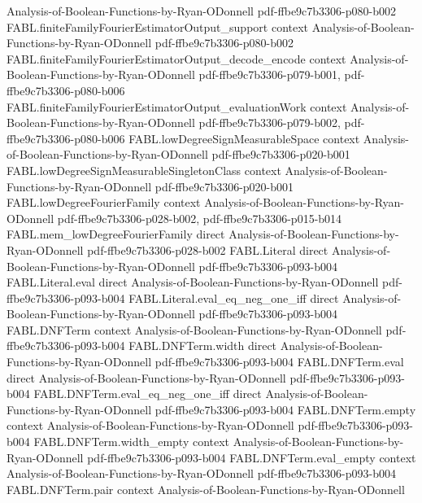 \begin{theorem}
  {Analysis-of-Boolean-Functions-by-Ryan-ODonnell}
  {pdf-ffbe9c7b3306-p080-b002}
\proofstep
  {FABL.finiteFamilyFourierEstimatorOutput_support}
  {context}
  {Analysis-of-Boolean-Functions-by-Ryan-ODonnell}
  {pdf-ffbe9c7b3306-p080-b002}
\proofstep
  {FABL.finiteFamilyFourierEstimatorOutput_decode_encode}
  {context}
  {Analysis-of-Boolean-Functions-by-Ryan-ODonnell}
  {pdf-ffbe9c7b3306-p079-b001,
    pdf-ffbe9c7b3306-p080-b006}
\proofstep
  {FABL.finiteFamilyFourierEstimatorOutput_evaluationWork}
  {context}
  {Analysis-of-Boolean-Functions-by-Ryan-ODonnell}
  {pdf-ffbe9c7b3306-p079-b002,
    pdf-ffbe9c7b3306-p080-b006}
\proofstep
  {FABL.lowDegreeSignMeasurableSpace}
  {context}
  {Analysis-of-Boolean-Functions-by-Ryan-ODonnell}
  {pdf-ffbe9c7b3306-p020-b001}
\proofstep
  {FABL.lowDegreeSignMeasurableSingletonClass}
  {context}
  {Analysis-of-Boolean-Functions-by-Ryan-ODonnell}
  {pdf-ffbe9c7b3306-p020-b001}
\proofstep
  {FABL.lowDegreeFourierFamily}
  {context}
  {Analysis-of-Boolean-Functions-by-Ryan-ODonnell}
  {pdf-ffbe9c7b3306-p028-b002,
    pdf-ffbe9c7b3306-p015-b014}
\proofstep
  {FABL.mem_lowDegreeFourierFamily}
  {direct}
  {Analysis-of-Boolean-Functions-by-Ryan-ODonnell}
  {pdf-ffbe9c7b3306-p028-b002}
\proofstep
  {FABL.Literal}
  {direct}
  {Analysis-of-Boolean-Functions-by-Ryan-ODonnell}
  {pdf-ffbe9c7b3306-p093-b004}
\proofstep
  {FABL.Literal.eval}
  {direct}
  {Analysis-of-Boolean-Functions-by-Ryan-ODonnell}
  {pdf-ffbe9c7b3306-p093-b004}
\proofstep
  {FABL.Literal.eval_eq_neg_one_iff}
  {direct}
  {Analysis-of-Boolean-Functions-by-Ryan-ODonnell}
  {pdf-ffbe9c7b3306-p093-b004}
\proofstep
  {FABL.DNFTerm}
  {context}
  {Analysis-of-Boolean-Functions-by-Ryan-ODonnell}
  {pdf-ffbe9c7b3306-p093-b004}
\proofstep
  {FABL.DNFTerm.width}
  {direct}
  {Analysis-of-Boolean-Functions-by-Ryan-ODonnell}
  {pdf-ffbe9c7b3306-p093-b004}
\proofstep
  {FABL.DNFTerm.eval}
  {direct}
  {Analysis-of-Boolean-Functions-by-Ryan-ODonnell}
  {pdf-ffbe9c7b3306-p093-b004}
\proofstep
  {FABL.DNFTerm.eval_eq_neg_one_iff}
  {direct}
  {Analysis-of-Boolean-Functions-by-Ryan-ODonnell}
  {pdf-ffbe9c7b3306-p093-b004}
\proofstep
  {FABL.DNFTerm.empty}
  {context}
  {Analysis-of-Boolean-Functions-by-Ryan-ODonnell}
  {pdf-ffbe9c7b3306-p093-b004}
\proofstep
  {FABL.DNFTerm.width_empty}
  {context}
  {Analysis-of-Boolean-Functions-by-Ryan-ODonnell}
  {pdf-ffbe9c7b3306-p093-b004}
\proofstep
  {FABL.DNFTerm.eval_empty}
  {context}
  {Analysis-of-Boolean-Functions-by-Ryan-ODonnell}
  {pdf-ffbe9c7b3306-p093-b004}
\proofstep
  {FABL.DNFTerm.pair}
  {context}
  {Analysis-of-Boolean-Functions-by-Ryan-ODonnell}

\end{theorem}
